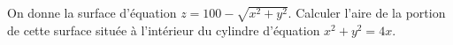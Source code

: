 \begin{exercice}\label{exoTP40004}

	On donne la surface d'équation $z=100-\sqrt{x^2+y^2}$. Calculer l'aire de la portion de cette surface située à l'intérieur du cylindre d'équation $x^2+y^2=4x$.

\end{exercice}
